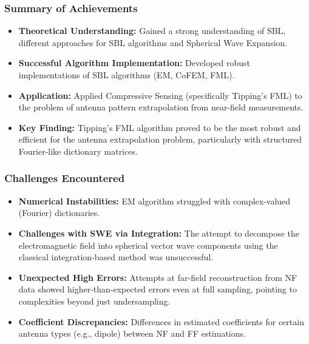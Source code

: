 \documentclass{beamer}
\begin{document}
\begin{frame}
    \frametitle{Summary of Achievements}
    \begin{itemize}
        \item \textbf{Theoretical Understanding:} Gained a strong understanding of SBL, different approaches for SBL algorithms and Spherical Wave Expansion.
        \item \textbf{Successful Algorithm Implementation:} Developed robust implementations of SBL algorithms (EM, CoFEM, FML).
        \item \textbf{Application:} Applied Compressive Sensing (specifically Tipping's FML) to the problem of antenna pattern extrapolation from near-field measurements.
        \item \textbf{Key Finding:} Tipping's FML algorithm proved to be the most robust and efficient for the antenna extrapolation problem, particularly with structured Fourier-like dictionary matrices.
    \end{itemize}
\end{frame}

\begin{frame}
    \frametitle{Challenges Encountered}
    \begin{itemize}
        \item \textbf{Numerical Instabilities:} EM algorithm struggled with complex-valued (Fourier) dictionaries.
        \item \textbf{Challenges with SWE via Integration:} The attempt to decompose the electromagnetic field into spherical vector wave components using the classical integration-based method was unsuccessful.
        \item \textbf{Unexpected High Errors:} Attempts at far-field reconstruction from NF data showed higher-than-expected errors even at full sampling, pointing to complexities beyond just undersampling.
        \item \textbf{Coefficient Discrepancies:} Differences in estimated coefficients for certain antenna types (e.g., dipole) between NF and FF estimations.
    \end{itemize}
\end{frame}
\end{document}
